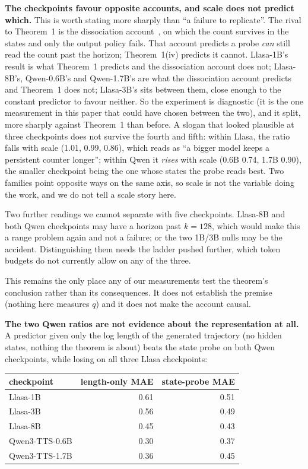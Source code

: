\documentclass[11pt]{article}
\begin{document}
\noindent\textbf{The checkpoints favour opposite accounts, and scale does not
predict which.} This is worth stating more sharply than ``a failure to
replicate''. The rival to Theorem~1 is the dissociation
account~\cite{venkatesh2026repeated}, on which the count survives in the states
and only the output policy fails. That account predicts a probe \emph{can} still
read the count past the horizon; Theorem~1(iv) predicts it cannot. Llasa-1B's
result is what Theorem~1 predicts and the dissociation account does not;
Llasa-8B's, Qwen-0.6B's and Qwen-1.7B's are what the dissociation account
predicts and Theorem~1 does not; Llasa-3B's sits between them, close enough to
the constant predictor to favour neither. So the experiment is diagnostic (it
is the one measurement in this paper that could have chosen between the two),
and it split, more sharply against Theorem~1 than before. A slogan that looked
plausible at three checkpoints does not survive the fourth and fifth: within
Llasa, the ratio falls with scale (1.01, 0.99, 0.86), which reads as ``a bigger
model keeps a persistent counter longer''; within Qwen it \emph{rises} with scale
(0.6B 0.74, 1.7B 0.90), the smaller checkpoint being the one whose states the
probe reads best. Two families point opposite ways on the same axis, so scale is
not the variable doing the work, and we do not tell a scale story here.

Two further readings we cannot separate with five checkpoints. Llasa-8B and both
Qwen checkpoints may have a horizon past $k=128$, which would make this a range
problem again and not a failure; or the two 1B/3B nulls may be the accident.
Distinguishing them needs the ladder pushed further, which token budgets do not
currently allow on any of the three.

This remains the only place any of our measurements test the theorem's conclusion
rather than its consequences. It does not establish the premise (nothing here
measures $q$) and it does not make the account causal.

\noindent\textbf{The two Qwen ratios are not evidence about the representation at
all.} A predictor given only the log length of the generated trajectory (no
hidden states, nothing the theorem is about) beats the state probe on both
Qwen checkpoints, while losing on all three Llasa checkpoints:

\begin{center}
\begin{tabular}{lrr}
\toprule
checkpoint & length-only MAE & state-probe MAE \\
\midrule
Llasa-1B       & 0.61 & 0.51 \\
Llasa-3B       & 0.56 & 0.49 \\
Llasa-8B       & 0.45 & 0.43 \\
Qwen3-TTS-0.6B & 0.30 & 0.37 \\
Qwen3-TTS-1.7B & 0.36 & 0.45 \\
\bottomrule
\end{tabular}
\end{center}
\end{document}
